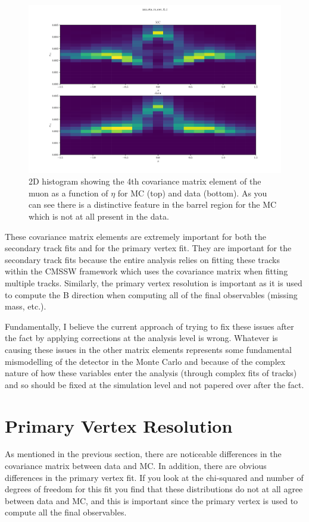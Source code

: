 \documentclass[12pt]{report}
\begin{document}
\begin{figure}
\centering
\includegraphics[width=\linewidth]{mu_eta_vs_cov_4_4.png}
\caption{2D histogram showing the 4th covariance matrix element of the muon as a function of $\eta$ for MC (top) and data (bottom). As you can see there is a distinctive feature in the barrel region for the MC which is not at all present in the data.}
\label{fig:mu-eta-vs-cov-4-4}
\end{figure}

These covariance matrix elements are extremely important for both the secondary
track fits and for the primary vertex fit. They are important for the secondary
track fits because the entire analysis relies on fitting these tracks within
the CMSSW framework which uses the covariance matrix when fitting multiple
tracks. Similarly, the primary vertex resolution is important as it is used to
compute the B direction when computing all of the final observables (missing
mass, etc.).

Fundamentally, I believe the current approach of trying to fix these issues
after the fact by applying corrections at the analysis level is wrong. Whatever
is causing these issues in the other matrix elements represents some
fundamental mismodelling of the detector in the Monte Carlo and because of the
complex nature of how these variables enter the analysis (through complex fits
of tracks) and so should be fixed at the simulation level and not papered over
after the fact.

\section{Primary Vertex Resolution}
As mentioned in the previous section, there are noticeable differences in the
covariance matrix between data and MC. In addition, there are obvious
differences in the primary vertex fit. If you look at the chi-squared and
number of degrees of freedom for this fit you find that these distributions do
not at all agree between data and MC, and this is important since the primary
vertex is used to compute all the final observables.
\end{document}
